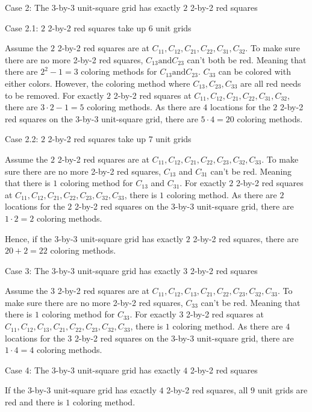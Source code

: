 \begin{enumerate}
 
Case 2: The 3-by-3 unit-square grid has exactly $2$ 2-by-2 red squares

 Case 2.1: $2$ 2-by-2 red squares take up $6$ unit grids

 Assume the $2$ 2-by-2 red squares are at $C_{11}, C_{12}, C_{21}, C_{22}, C_{31}, C_{32}$. To make sure there are no more 2-by-2 red squares, $C_{13} \text{and} C_{23}$ can't both be red. Meaning that there are $2^2-1=3$ coloring methods for $C_{13} \text{and} C_{23}$. $C_{33}$ can be colored with either colors. However, the coloring method where $C_{13}, C_{23}, C_{33}$ are all red needs to be removed. For exactly $2$ 2-by-2 red squares at $C_{11}, C_{12}, C_{21}, C_{22}, C_{31}, C_{32}$, there are $3 \cdot 2 -1=5$ coloring methods. As there are $4$ locations for the $2$ 2-by-2 red squares on the 3-by-3 unit-square grid, there are $5 \cdot 4 = 20$ coloring methods.

 Case 2.2: $2$ 2-by-2 red squares take up $7$ unit grids

 Assume the $2$ 2-by-2 red squares are at $C_{11}, C_{12}, C_{21}, C_{22}, C_{23}, C_{32}, C_{33}$. To make sure there are no more 2-by-2 red squares, $C_{13}$ and $C_{31}$ can't be red. Meaning that there is $1$ coloring method for $C_{13}$ and $C_{31}$. For exactly $2$ 2-by-2 red squares at $C_{11}, C_{12}, C_{21}, C_{22}, C_{23}, C_{32}, C_{33}$, there is $1$ coloring method. As there are $2$ locations for the $2$ 2-by-2 red squares on the 3-by-3 unit-square grid, there are $1 \cdot 2 = 2$ coloring methods.

 Hence, if the 3-by-3 unit-square grid has exactly $2$ 2-by-2 red squares, there are $20+2 = 22$ coloring methods.

 
Case 3: The 3-by-3 unit-square grid has exactly $3$ 2-by-2 red squares

 Assume the $3$ 2-by-2 red squares are at $C_{11}, C_{12}, C_{13}, C_{21}, C_{22}, C_{23}, C_{32}, C_{33}$. To make sure there are no more 2-by-2 red squares, $C_{33}$ can't be red. Meaning that there is $1$ coloring method for $C_{33}$. For exactly $3$ 2-by-2 red squares at $C_{11}, C_{12}, C_{13}, C_{21}, C_{22}, C_{23}, C_{32}, C_{33}$, there is $1$ coloring method. As there are $4$ locations for the $3$ 2-by-2 red squares on the 3-by-3 unit-square grid, there are $1 \cdot 4 = 4$ coloring methods.

 
Case 4: The 3-by-3 unit-square grid has exactly $4$ 2-by-2 red squares

 If the 3-by-3 unit-square grid has exactly $4$ 2-by-2 red squares, all $9$ unit grids are red and there is $1$ coloring method.


\end{enumerate}
